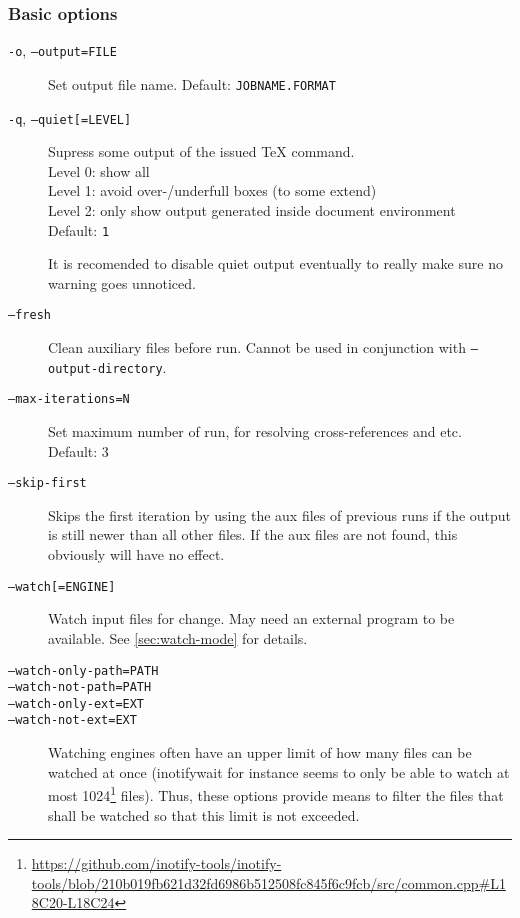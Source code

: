 \documentclass[a4paper, 11pt]{scrartcl}
\newcommand\metavar[1]{\textnormal{\textsf{#1}}}
\begin{document}
\subsubsection{Basic options}
\begin{description}
\item[\texttt{-o}, \texttt{--output=\metavar{FILE}}]
  Set output file name.
  Default: \texttt{\metavar{JOBNAME}.\metavar{FORMAT}}
\item[\texttt{-q}, \texttt{--quiet[=\metavar{LEVEL}]}]
  Supress some output of the issued TeX command.\\
  Level 0: show all\\
  Level 1: avoid over-/underfull boxes (to some extend)\\
  Level 2: only show output generated inside document environment\\
  Default: \texttt{1}

  It is recomended to disable quiet output eventually to really make sure no warning goes unnoticed.
\item[\texttt{--fresh}]
  Clean auxiliary files before run.
  Cannot be used in conjunction with \texttt{--output-directory}.
\item[\texttt{--max-iterations=\metavar{N}}]
  Set maximum number of run, for resolving cross-references and etc.
  Default: 3
\item[\texttt{--skip-first}]
  Skips the first iteration by using the aux files of previous runs if the
  output is still newer than all other files. If the aux files are not found,
  this obviously will have no effect.
\item[\texttt{--watch[=\metavar{ENGINE}]}]
  Watch input files for change.
  May need an external program to be available.
  See \autoref{sec:watch-mode} for details.
\item[\texttt{--watch-only-path=\metavar{PATH}}]
\item[\texttt{--watch-not-path=\metavar{PATH}}]
\item[\texttt{--watch-only-ext=\metavar{EXT}}]
\item[\texttt{--watch-not-ext=\metavar{EXT}}]
  Watching engines often have an upper limit of how many files can be watched at once
  (inotifywait for instance seems to only be able to watch at most 1024\footnote{\url{https://github.com/inotify-tools/inotify-tools/blob/210b019fb621d32fd6986b512508fc845f6c9fcb/src/common.cpp\#L18C20-L18C24}} files). Thus, these options provide means to filter the files that shall be watched so that this limit is not exceeded.


\end{description}
\end{document}
